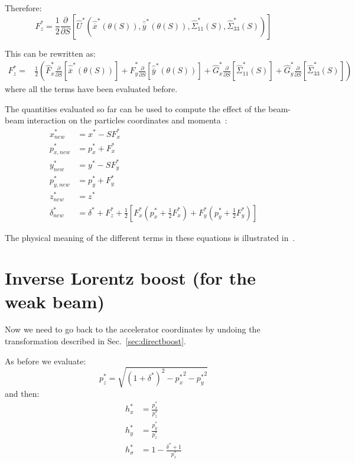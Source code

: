 Therefore:
\begin{equation}
F^*_z  =  \frac{1}{2}\frac{\partial }{\partial S} \left[
\hat{U}^*\left(\hat{\overline{x}}^*\left(\theta (S)\right), \hat{\overline{y}}^*\left(\theta (S)\right) , \hat{\Sigma}^*_{11}(S), \hat{\Sigma}^*_{33}(S)\right) 
\right]
\end{equation}

This can be rewritten as:
\begin{align}
F^*_z  =  &\frac{1}{2}\left(
\hat{F}^*_x \frac{\partial }{\partial S} \left[\hat{\overline{x}}^*\left(\theta (S)\right) \right]+
\hat{F}^*_y \frac{\partial }{\partial S} \left[\hat{\overline{y}}^*\left(\theta (S)\right) \right]+
\hat{G}^*_x\frac{\partial }{\partial S} \left[\hat{\Sigma}^*_{11}(S)\right]+
\hat{G}^*_y\frac{\partial }{\partial S} \left[\hat{\Sigma}^*_{33}(S)\right]\right)
\end{align}
where all the terms have been evaluated before.

The quantities evaluated so far can be used to compute the effect of the beam-beam interaction on the particles coordinates and momenta~\cite{hirata}:
\begin{align}
x^*_{new} &= x^* - S {F}^*_x\\
p^*_{x, new} &= p^*_{x} + {F}^*_x\\
y^*_{new} &= y^* - S {F}^*_y\\
p^*_{y, new} &= p^*_{y} + {F}^*_y\\
z^*_{new} &= z^*\\
\delta^*_{new} &= \delta^* + {F}^*_z
+\frac{1}{2}\left[ 
{F}^*_x\left(p^*_{x} + \frac{1}{2}{F}^*_x\right)+
{F}^*_y\left(p^*_{y} + \frac{1}{2}{F}^*_y\right)
\right]
\end{align}

The physical meaning of the different terms in these equations is illustrated in~\cite{bb6dslides}.

\section{Inverse Lorentz boost (for the weak beam)}

Now we need to go back to the accelerator coordinates by undoing the transformation described in Sec.~\ref{sec:directboost}.

As before we evaluate:
\begin{equation}
p^*_z  =  \sqrt{\left(1+\delta^*\right)^2-{p_x^*}^2-{p_y^*}^2}
\end{equation}
and then:
\begin{align}
h^*_x &= \frac{p^*_x}{p^*_z}\\
h^*_y &= \frac{p^*_y}{p^*_z}\\
h^*_\sigma &= 1-\frac{\delta^*+1}{p^*_z}
\end{align}

